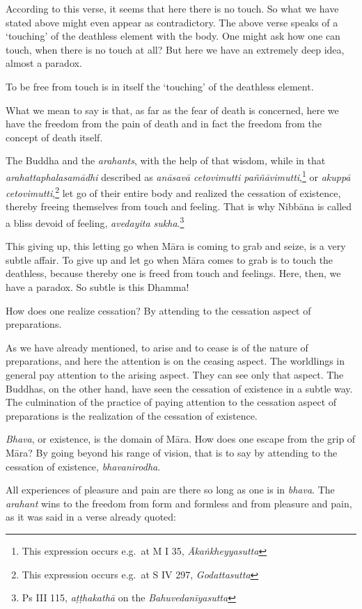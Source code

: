 According to this verse, it seems that here there is no touch. So what we have stated above might even appear as contradictory. The above verse speaks of a `touching' of the deathless element with the body. One might ask how one can touch, when there is no touch at all? But here we have an extremely deep idea, almost a paradox.

To be free from touch is in itself the `touching' of the deathless element.

What we mean to say is that, as far as the fear of death is concerned, here we have the freedom from the pain of death and in fact the freedom from the concept of death itself.

The Buddha and the \emph{arahants}, with the help of that wisdom, while in that \emph{arahattaphalasamādhi} described as \emph{anāsavā cetovimutti paññāvimutti},\footnote{This expression occurs e.g.~at M I 35, \emph{Ākaṅkheyyasutta}} or \emph{akuppā cetovimutti},\footnote{This expression occurs e.g.~at S IV 297, \emph{Godattasutta}} let go of their entire body and realized the cessation of existence, thereby freeing themselves from touch and feeling. That is why Nibbāna is called a bliss devoid of feeling, \emph{avedayita sukha}.\footnote{Ps III 115, \emph{aṭṭhakathā} on the \emph{Bahuvedanīyasutta}}

This giving up, this letting go when Māra is coming to grab and seize, is a very subtle affair. To give up and let go when Māra comes to grab is to touch the deathless, because thereby one is freed from touch and feelings. Here, then, we have a paradox. So subtle is this Dhamma!

How does one realize cessation? By attending to the cessation aspect of preparations.

As we have already mentioned, to arise and to cease is of the nature of preparations, and here the attention is on the ceasing aspect. The worldlings in general pay attention to the arising aspect. They can see only that aspect. The Buddhas, on the other hand, have seen the cessation of existence in a subtle way. The culmination of the practice of paying attention to the cessation aspect of preparations is the realization of the cessation of existence.

\emph{Bhava}, or existence, is the domain of Māra. How does one escape from the grip of Māra? By going beyond his range of vision, that is to say by attending to the cessation of existence, \emph{bhavanirodha}.

All experiences of pleasure and pain are there so long as one is in \emph{bhava}. The \emph{arahant} wins to the freedom from form and formless and from pleasure and pain, as it was said in a verse already quoted:

